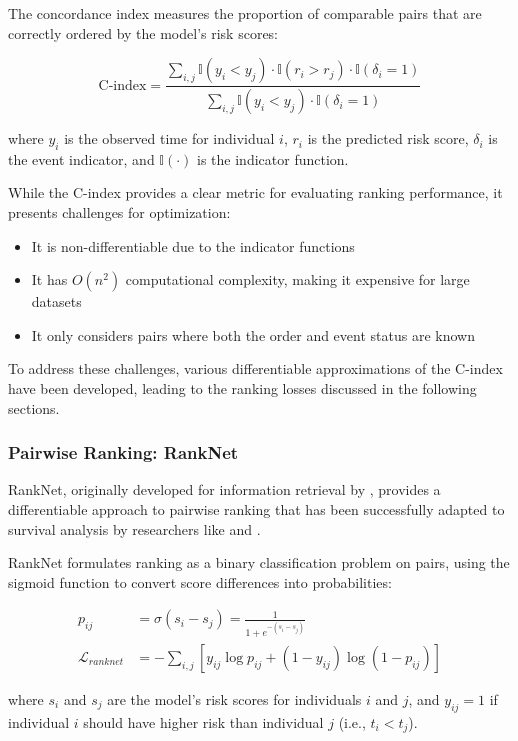 \begin{definitionbox}[title=Concordance Index (C-index)]
  The concordance index measures the proportion of comparable pairs that are correctly ordered by the model's risk scores:

  \begin{equation}
    \text{C-index} = \frac{\sum_{i,j} \mathbb{I}(y_i < y_j) \cdot \mathbb{I}(r_i > r_j) \cdot \mathbb{I}(\delta_i = 1)}{\sum_{i,j} \mathbb{I}(y_i < y_j) \cdot \mathbb{I}(\delta_i = 1)}
  \end{equation}

  where $y_i$ is the observed time for individual $i$, $r_i$ is the predicted risk score, $\delta_i$ is the event indicator, and $\mathbb{I}(\cdot)$ is the indicator function.
\end{definitionbox}

While the C-index provides a clear metric for evaluating ranking performance, it presents challenges for optimization:
\begin{itemize}
\item It is non-differentiable due to the indicator functions
\item It has $O(n^2)$ computational complexity, making it expensive for large datasets
\item It only considers pairs where both the order and event status are known
\end{itemize}

To address these challenges, various differentiable approximations of the C-index have been developed, leading to the ranking losses discussed in the following sections.

\subsubsection{Pairwise Ranking: RankNet}

RankNet, originally developed for information retrieval by \textcite{burges2005}, provides a differentiable approach to pairwise ranking that has been successfully adapted to survival analysis by researchers like \textcite{chapfuwa2018} and \textcite{kvamme2019}.

\begin{definitionbox}[title=RankNet Loss]
  RankNet formulates ranking as a binary classification problem on pairs, using the sigmoid function to convert score differences into probabilities:

  \begin{align}
    p_{ij} &= \sigma(s_i - s_j) = \frac{1}{1 + e^{-(s_i - s_j)}} \\
    \mathcal{L}_{ranknet} &= -\sum_{i,j} \left[ y_{ij} \log p_{ij} + (1 - y_{ij}) \log (1 - p_{ij}) \right]
  \end{align}

  where $s_i$ and $s_j$ are the model's risk scores for individuals $i$ and $j$, and $y_{ij} = 1$ if individual $i$ should have higher risk than individual $j$ (i.e., $t_i < t_j$).
\end{definitionbox}

